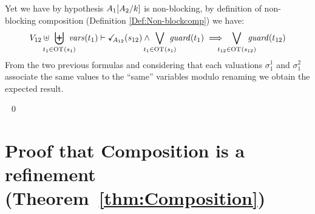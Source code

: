 \documentclass[runningheads]{llncs}
\begin{document}
Yet we have by hypothesis  \(A_1{\left[A_2\middle/k\right]}\) is non-blocking, by definition of non-blocking composition (Definition \ref{Def:Non-blockcomp}) we have:
\begin{multline*}
 V_{12} \uplus  \biguplus_\subbox{t_1 \in \fOT{s_1}} \fvars{t_1} \vdash
 \reach{A_{12}} \mpar{s_{12}}  \wedge  \bigvee_\subbox{t_{1} \in \fOT{s_{1}}} \fguard{t_{1}}  \implies \bigvee_\subbox{t_{12} \in \fOT{s_{12}}} \fguard{t_{12}}
\end{multline*}
From the two previous formulas and considering that each valuations $\sigma_{1}^1$ and $\sigma_{1}^2$ associate the same values to the ``same'' variables modulo renaming we obtain the expected result.

~\qed
 




\section{Proof that Composition is a refinement (Theorem~\ref{thm:Composition})}
\end{document}
